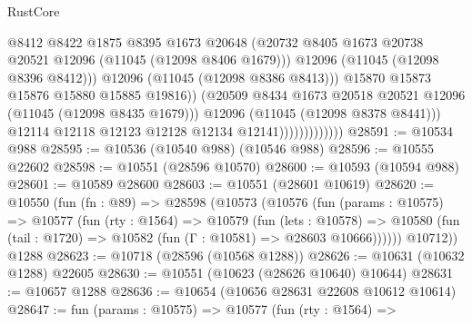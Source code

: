 \begin{lexlean}{RustCore}
\begin{coremodule}
                                        @8412
                                        @8422
                                        @1875
                                        @8395
                                        @1673
                                        @20648
                                        (@20732
                                          @8405
                                          @1673
                                          @20738
                                          @20521
                                          @12096
                                          (@11045 (@12098 @8406 @1679)))
                                        @12096
                                        (@11045 (@12098 @8396 @8412)))
                                      @12096
                                      (@11045 (@12098 @8386 @8413)))
                                    @15870
                                    @15873
                                    @15876
                                    @15880
                                    @15885
                                    @19816))
                                (@20509
                                  @8434
                                  @1673
                                  @20518
                                  @20521
                                  @12096
                                  (@11045 (@12098 @8435 @1679)))
                                @12096
                                (@11045 (@12098 @8378 @8441)))
                              @12114
                              @12118
                              @12123
                              @12128
                              @12134
                              @12141)))))))))))))
@28591 := @10534 @988
@28595 := @10536 (@10540 @988) (@10546 @988)
@28596 := @10555 @22602
@28598 := @10551 (@28596 @10570)
@28600 := @10593 (@10594 @988)
@28601 := @10589 @28600
@28603 := @10551 (@28601 @10619)
@28620 := @10550
    (fun (fn : @89) =>
    @28598
      (@10573
        (@10576
          (fun (params : @10575) =>
          @10577
            (fun (rty : @1564) =>
            @10579
              (fun (lets : @10578) =>
              @10580 (fun (tail : @1720) => @10582 (fun (Γ : @10581) => @28603 @10666))))))
        @10712))
    @1288
@28623 := @10718 (@28596 (@10568 @1288))
@28626 := @10631 (@10632 @1288) @22605
@28630 := @10551 (@10623 (@28626 @10640) @10644)
@28631 := @10657 @1288
@28636 := @10654 (@10656 @28631 @22608 @10612 @10614)
@28647 := fun (params : @10575) =>
  @10577
    (fun (rty : @1564) =>

\end{coremodule}
\end{lexlean}
